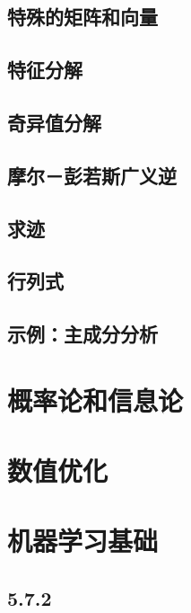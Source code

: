 \documentclass[a4paper,11pt]{book}
\begin{document}
\section{特殊的矩阵和向量}
\label{sec:2.6}

\section{特征分解}
\label{sec:2.7}

\section{奇异值分解}
\label{sec:2.8}

\section{摩尔－彭若斯广义逆}
\label{sec:2.9}

\section{求迹}
\label{sec:2.10}

\section{行列式}
\label{sec:2.11}

\section{示例：主成分分析}
\label{sec:2.12}

\chapter{概率论和信息论}
\label{chap:3}

\chapter{数值优化}
\label{chap:4}

\chapter{机器学习基础}
\label{chap:5}

\section{5.7.2}
\label{sec:5.7.2}
\end{document}
